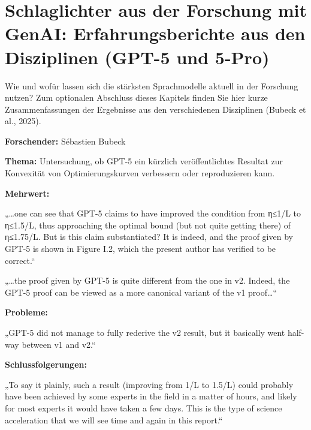 \documentclass[
  ngerman,
  letterpaper,
  DIV=11]{scrreprt}
\begin{document}
\section{Schlaglichter aus der Forschung mit GenAI: Erfahrungsberichte
aus den Disziplinen (GPT-5 und 5-Pro)}\label{sec-forschung-details}

Wie und wofür lassen sich die stärksten Sprachmodelle aktuell in der
Forschung nutzen? Zum optionalen Abschluss dieses Kapitels finden Sie
hier kurze Zusammenfassungen der Ergebnisse aus den verschiedenen
Disziplinen (Bubeck et al., 2025).

\begin{tcolorbox}[enhanced jigsaw, left=2mm, bottomrule=.15mm, arc=.35mm, rightrule=.15mm, colframe=quarto-callout-note-color-frame, coltitle=black, colback=white, toprule=.15mm, toptitle=1mm, colbacktitle=quarto-callout-note-color!10!white, title=\textcolor{quarto-callout-note-color}{\faInfo}\hspace{0.5em}{Mathematik / Optimierung der Schrittweite}, opacitybacktitle=0.6, leftrule=.75mm, bottomtitle=1mm, titlerule=0mm, opacityback=0, breakable]

\textbf{Forschender:} Sébastien Bubeck

\textbf{Thema:} Untersuchung, ob GPT-5 ein kürzlich veröffentlichtes
Resultat zur Konvexität von Optimierungskurven verbessern oder
reproduzieren kann.

\textbf{Mehrwert:}

„\ldots one can see that GPT-5 claims to have improved the condition
from η≤1/L to η≤1.5/L, thus approaching the optimal bound (but not quite
getting there) of η≤1.75/L. But is this claim substantiated? It is
indeed, and the proof given by GPT-5 is shown in Figure I.2, which the
present author has verified to be correct.``

„\ldots the proof given by GPT-5 is quite different from the one in v2.
Indeed, the GPT-5 proof can be viewed as a more canonical variant of the
v1 proof\ldots``

\textbf{Probleme:}

„GPT-5 did not manage to fully rederive the v2 result, but it basically
went half-way between v1 and v2.``

\textbf{Schlussfolgerungen:}

„To say it plainly, such a result (improving from 1/L to 1.5/L) could
probably have been achieved by some experts in the field in a matter of
hours, and likely for most experts it would have taken a few days. This
is the type of science acceleration that we will see time and again in
this report.``

\end{tcolorbox}
\end{document}
